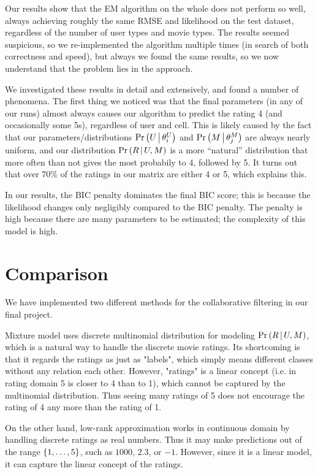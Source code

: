 \documentclass{article}
\begin{document}
Our results show that the EM algorithm on the whole does not perform
so well, always achieving roughly the same RMSE and likelihood on the
test dataset, regardless of the number of user types and movie types.
The results seemed suspicious, so we re-implemented the algorithm
multiple times (in search of both correctness and speed), but always
we found the same results, so we now understand that the problem lies
in the approach.

We investigated these results in detail and extensively, and
found a number of phenomena. The first thing we noticed was that the
final parameters (in any of our runs) almost always causes our
algorithm to predict the rating 4 (and occasionally some 5s),
regardless of user and cell. This is likely caused by the fact that
our parameters/distributions ${{\Pr \left(  U \,\middle|\, \theta^U_i  \right)}}$ and
${{\Pr \left(  M \,\middle|\, \theta^M_j  \right)}}$ are always nearly uniform, and our distribution
${{\Pr \left(  R \,\middle|\, U,M  \right)}}$ is a more ``natural'' distribution that more often than
not gives the most probabily to 4, followed by 5. It turns out that
over 70\% of the ratings in our matrix are either 4 or 5, which
explains this.

In our results, the BIC penalty dominates the final BIC score; this is
because the likelihood changes only negligibly compared to the BIC
penalty. The penalty is high because there are many parameters to be
estimated; the complexity of this model is high.



\section{Comparison}
\label{sec:comparison}
We have implemented two different methods for the collaborative filtering in our final project. 

Mixture model uses discrete multinomial distribution for modeling ${{\Pr \left(  R \,\middle|\, U,M  \right)}}$, which is a natural way to handle the discrete movie ratings. Its shortcoming is that it regards the ratings as just as "labels", which simply means different classes without any relation each other. However, "ratings" is a linear concept (i.e. in rating domain 5 is closer to 4 than to 1), which cannot be captured by the multinomial distribution. Thus seeing many ratings of 5 does not encourage the rating of 4 any more than the rating of 1.

On the other hand, low-rank approximation works in continuous domain by handling discrete ratings as real numbers. Thus it may make predictions out of the range ${\left\{ 1, \dots, 5 \right\}}$, such as $1000$, $2.3$, or $-1$. However, since it is a linear model, it can capture the linear concept of the ratings.  
\end{document}
